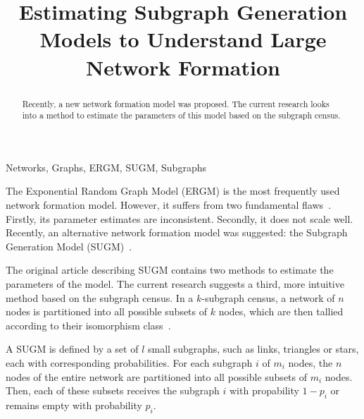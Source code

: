 \documentclass[conference]{IEEEtran}
\begin{document}
\title{Estimating Subgraph Generation Models to Understand Large Network Formation}

\author{
\and
{}
}

\maketitle

\begin{abstract}
Recently, a new network formation model was proposed. The current research looks into a method to estimate the parameters of this model based on the subgraph census.
\end{abstract}

\begin{IEEEkeywords}
Networks, Graphs, ERGM, SUGM, Subgraphs
\end{IEEEkeywords}

The Exponential Random Graph Model (ERGM) is the most frequently used network formation model. However, it suffers from two fundamental flaws~\cite{Chandrasekhar2014}. Firstly, its parameter estimates are inconsistent. Secondly, it does not scale well. Recently, an alternative network formation model was suggested: the Subgraph Generation Model (SUGM)~\cite{Chandrasekhar2014}.

The original article describing SUGM contains two methods to estimate the parameters of the model. The current research suggests a third, more intuitive method based on the subgraph census. In a $k$-subgraph census, a network of $n$ nodes is partitioned into all possible subsets of $k$ nodes, which are then tallied according to their isomorphism class~\cite{Davis1972}.

A SUGM is defined by a set of $l$ small subgraphs, such as links, triangles or stars, each with corresponding probabilities. For each subgraph $i$ of $m_{i}$ nodes, the $n$ nodes of the entire network are partitioned into all possible subsets of $m_{i}$ nodes. Then, each of these subsets receives the subgraph $i$ with propability $1-p_{i}$ or remains empty with probability $p_{i}$.
\end{document}
